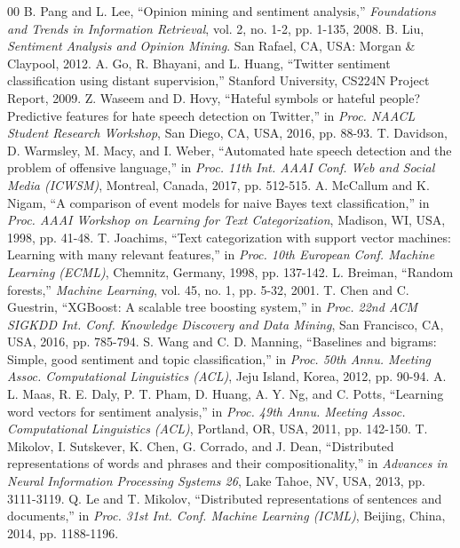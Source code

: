 \documentclass[journal,10pt]{IEEEtran}
\begin{document}
\begin{thebibliography}{00}
 B. Pang and L. Lee, ``Opinion mining and sentiment analysis,'' \emph{Foundations and Trends in Information Retrieval}, vol. 2, no. 1-2, pp. 1-135, 2008.
 B. Liu, \emph{Sentiment Analysis and Opinion Mining}. San Rafael, CA, USA: Morgan \& Claypool, 2012.
 A. Go, R. Bhayani, and L. Huang, ``Twitter sentiment classification using distant supervision,'' Stanford University, CS224N Project Report, 2009.
 Z. Waseem and D. Hovy, ``Hateful symbols or hateful people? Predictive features for hate speech detection on Twitter,'' in \emph{Proc. NAACL Student Research Workshop}, San Diego, CA, USA, 2016, pp. 88-93.
 T. Davidson, D. Warmsley, M. Macy, and I. Weber, ``Automated hate speech detection and the problem of offensive language,'' in \emph{Proc. 11th Int. AAAI Conf. Web and Social Media (ICWSM)}, Montreal, Canada, 2017, pp. 512-515.
 A. McCallum and K. Nigam, ``A comparison of event models for naive Bayes text classification,'' in \emph{Proc. AAAI Workshop on Learning for Text Categorization}, Madison, WI, USA, 1998, pp. 41-48.
 T. Joachims, ``Text categorization with support vector machines: Learning with many relevant features,'' in \emph{Proc. 10th European Conf. Machine Learning (ECML)}, Chemnitz, Germany, 1998, pp. 137-142.
 L. Breiman, ``Random forests,'' \emph{Machine Learning}, vol. 45, no. 1, pp. 5-32, 2001.
 T. Chen and C. Guestrin, ``XGBoost: A scalable tree boosting system,'' in \emph{Proc. 22nd ACM SIGKDD Int. Conf. Knowledge Discovery and Data Mining}, San Francisco, CA, USA, 2016, pp. 785-794.
 S. Wang and C. D. Manning, ``Baselines and bigrams: Simple, good sentiment and topic classification,'' in \emph{Proc. 50th Annu. Meeting Assoc. Computational Linguistics (ACL)}, Jeju Island, Korea, 2012, pp. 90-94.
 A. L. Maas, R. E. Daly, P. T. Pham, D. Huang, A. Y. Ng, and C. Potts, ``Learning word vectors for sentiment analysis,'' in \emph{Proc. 49th Annu. Meeting Assoc. Computational Linguistics (ACL)}, Portland, OR, USA, 2011, pp. 142-150.
 T. Mikolov, I. Sutskever, K. Chen, G. Corrado, and J. Dean, ``Distributed representations of words and phrases and their compositionality,'' in \emph{Advances in Neural Information Processing Systems 26}, Lake Tahoe, NV, USA, 2013, pp. 3111-3119.
 Q. Le and T. Mikolov, ``Distributed representations of sentences and documents,'' in \emph{Proc. 31st Int. Conf. Machine Learning (ICML)}, Beijing, China, 2014, pp. 1188-1196.

\end{thebibliography}
\end{document}
